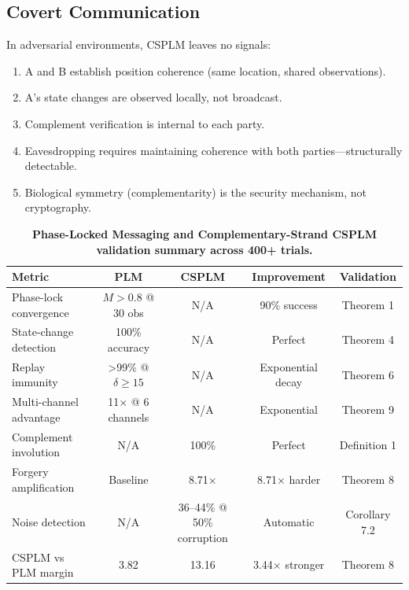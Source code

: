 \documentclass[twocolumn,10pt,a4paper]{article}
\theoremstyle{plain}
\theoremstyle{definition}
\begin{document}
\subsection{Covert Communication}

In adversarial environments, CSPLM leaves no signals:
\begin{enumerate}
\item A and B establish position coherence (same location, shared observations).
\item A's state changes are observed locally, not broadcast.
\item Complement verification is internal to each party.
\item Eavesdropping requires maintaining coherence with both parties---structurally detectable.
\item Biological symmetry (complementarity) is the security mechanism, not cryptography.
\end{enumerate}

\begin{table}[!htbp]
    \centering
    \caption{\textbf{Phase-Locked Messaging and Complementary-Strand CSPLM validation summary across 400+ trials.}}
    \begin{tabular}{lcccc}
    \toprule
    \textbf{Metric} & \textbf{PLM} & \textbf{CSPLM} & \textbf{Improvement} & \textbf{Validation} \\
    \midrule
    Phase-lock convergence & $M>0.8$ @ 30 obs & N/A & 90\% success & Theorem 1 \\
    State-change detection & 100\% accuracy & N/A & Perfect & Theorem 4 \\
    Replay immunity & >99\% @ $\delta \geq 15$ & N/A & Exponential decay & Theorem 6 \\
    Multi-channel advantage & 11× @ 6 channels & N/A & Exponential & Theorem 9 \\
    \midrule
    Complement involution & N/A & 100\% & Perfect & Definition 1 \\
    Forgery amplification & Baseline & 8.71× & 8.71× harder & Theorem 8 \\
    Noise detection & N/A & 36--44\% @ 50\% corruption & Automatic & Corollary 7.2 \\
    CSPLM vs PLM margin & 3.82 & 13.16 & 3.44× stronger & Theorem 8 \\
    \bottomrule
    \end{tabular}
    \label{tab:validation_summary}
\end{table}
\end{document}
